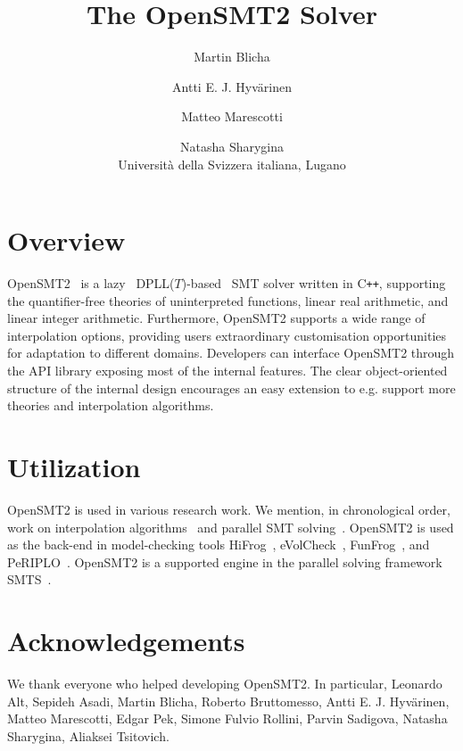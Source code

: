 \documentclass{article}
\title{The OpenSMT2 Solver}
\author{
Martin Blicha \and 
Antti E. J. Hyv{\"a}rinen \and
Matteo Marescotti \and
Natasha Sharygina \\
{\small Universit{\`a} della Svizzera italiana, Lugano}
}
\date{}
\begin{document}
\maketitle

\section{Overview}
OpenSMT2~\cite{HyvarinenMAS16} is a lazy~\cite{NieuwenhuisOT:JACM06}
DPLL($T$)-based~\cite{DavisLL:ACM1962}
SMT solver written in C{\tt ++}, supporting
the quantifier-free theories of uninterpreted functions, linear real arithmetic, and linear integer arithmetic.
Furthermore, OpenSMT2 supports a wide range of interpolation options, providing users extraordinary customisation opportunities for adaptation to different domains.
Developers can interface OpenSMT2 through the API library exposing most of the internal features. The clear object-oriented structure of the internal design encourages an easy extension to e.g. support more theories and interpolation algorithms.

\section{Utilization}
OpenSMT2 is used in various research work. We mention,
in chronological order, work on interpolation 
algorithms~\cite{BlichaHKS19,AltHAS17,JancikAFHKS16,AsadiBFHESC18}
and parallel SMT 
solving~\cite{HyvarinenMSCS18,MarescottiHS18,HyvarinenMS:SAT15}.
OpenSMT2 is
used as the back-end in model-checking tools
HiFrog~\cite{AltACMFHS17},
eVolCheck~\cite{FSS_TACAS13}, 
FunFrog~\cite{SFS_ATVA12}, and
PeRIPLO~\cite{RolliniAFHS:LPAR2013,AltFHS:VSTTE2015}.
OpenSMT2 is a supported engine in the parallel 
solving framework SMTS~\cite{MarescottiHS16}.

\section{Acknowledgements}
We thank everyone who helped
developing OpenSMT2. In particular,
Leonardo Alt,
Sepideh Asadi,
Martin Blicha,
Roberto Bruttomesso,
Antti E. J. Hyv{\"a}rinen,
Matteo Marescotti,
Edgar Pek,
Simone Fulvio Rollini, 
Parvin Sadigova,
Natasha Sharygina,
Aliaksei Tsitovich.



\end{document}
